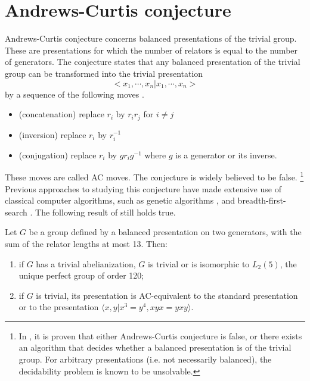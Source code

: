 
\section{Andrews-Curtis conjecture\label{sec:AC}}

Andrews-Curtis conjecture concerns balanced presentations
of the trivial group. These are presentations for which the number of relators is
equal to the number of generators. The conjecture states that any balanced presentation of
the trivial group can be transformed into the trivial presentation $$<x_1, \cdots, x_n | x_1, \cdots, x_n >$$ by
a sequence of the following moves \cite{Andrews-Curtis}.

\begin{itemize}
	\item (concatenation) replace $r_i$ by $r_i r_j$ for $i \neq j$
	\item (inversion) replace $r_i$ by $r_i^{-1}$
	\item (conjugation) replace $r_i$ by $g r_i g^{-1}$ where $g$ is a generator or its inverse.
\end{itemize}

These moves are called AC moves. The conjecture is widely believed to be false.
\footnote{In \cite{decidability}, it is proven that either Andrews-Curtis conjecture is false,
	or there exists an algorithm that decides whether a balanced presentation
	is of the trivial group. For arbitrary presentations (i.e. not necessarily balanced), the decidability
	problem is known to be unsolvable. } Previous approaches to studying this conjecture have made extensive use
of classical computer algorithms, such as genetic algorithms \cite{genetic}, and breadth-first-search  \cite{bfs-ac}. The following result of \cite{bfs-ac} still holds true.

\begin{theorem}
	Let $G$ be a group defined by a balanced presentation on two generators, with the sum
	of the relator lengths at most 13. Then:
	\begin{enumerate}[label=(\roman*)]
		\item if $G$ has a trivial abelianization, $G$ is trivial or is isomorphic to $L_2(5)$, the unique perfect
		group of order 120;
		\item if $G$ is trivial, its presentation is AC-equivalent to the standard presentation or to the presentation
		$\langle x, y | x^3 = y^4, xyx = yxy \rangle$.
	\end{enumerate}
\end{theorem}

